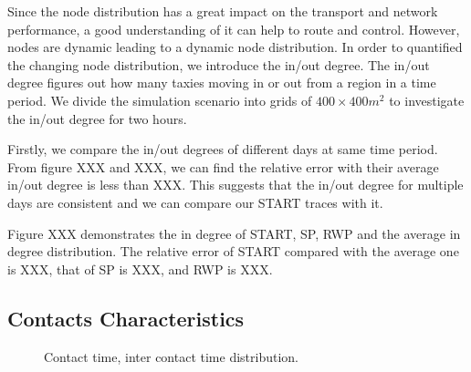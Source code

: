 Since the node distribution has a great impact on the transport and network performance, a good understanding of it can help to route and control.  However, nodes are dynamic leading to a dynamic node distribution. In order to quantified the changing node distribution,  we introduce the in/out degree. The in/out degree figures out how many taxies moving in or out from a region in a time period. 
We divide the simulation scenario into grids of $ 400\times 400 m^2$ to investigate the in/out degree for two hours. 

Firstly, we compare the in/out degrees of different days at same time period. From figure XXX and XXX, we can find the relative error with their average in/out degree is less than XXX. This suggests     that the in/out degree for multiple days are consistent and we can compare our START traces with it.

Figure XXX demonstrates the in degree of START, SP, RWP and the average in degree distribution. The relative error of START compared with the average one is XXX, that of SP is XXX,  and RWP is XXX.


\subsection{Contacts Characteristics}

\begin{figure}[!h]
\centering
{}

\caption{Contact time, inter contact time distribution.}\label{figure_contacts}
\end{figure}



